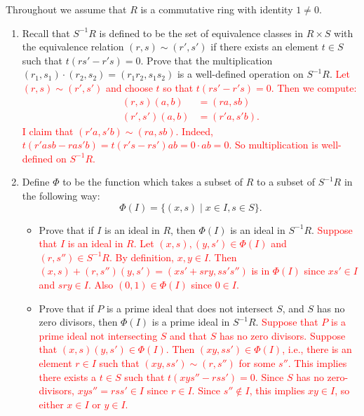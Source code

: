 \documentclass[12pt]{article}
\newcommand{\solution}[1]{\textcolor{red}{#1}}
\begin{document}
\pagestyle{fancy}

Throughout we assume that $R$ is a commutative ring with identity
$1\neq 0$.
\begin{enumerate}
\item Recall that $S^{-1}R$ is defined to be the set of equivalence
  classes in $R\times S$ with the equivalence relation $(r,s)\sim
  (r',s')$ if there exists an element $t\in S$ such that
  $t(rs'-r's)=0$. Prove that the multiplication $(r_1,s_1)\cdot
  (r_2,s_2)=(r_1r_2,s_1s_2)$ is a well-defined operation on
  $S^{-1}R$. 
\solution{
Let $(r,s)\sim (r',s')$ and choose $t$ so that $t(rs'-r's)=0$. Then we
compute:
\begin{align*}
  (r,s)(a,b) &= (ra,sb)\\
(r',s')(a,b) &= (r'a,s'b).
\end{align*}
I claim that $(r'a,s'b)\sim (ra,sb)$. Indeed, $t(r'asb-ras'b) =
t(r's-rs')ab = 0 \cdot ab = 0$. So multiplication is well-defined on
$S^{-1}R$. 
}
\item Define $\Phi$ to be the
  function which takes a subset of $R$ to a subset of $S^{-1}R$ in the
  following way: 
  \[\Phi(I) = \{(x,s) \mid x\in I, s\in S\}.\]
  \begin{itemize}
  \item Prove that if $I$ is an ideal in $R$, then $\Phi(I)$ is an
    ideal in $S^{-1}R$. 
\solution{Suppose that $I$ is an ideal in $R$. Let $(x,s), (y,s')\in \Phi(I)$ and
  $(r,s'') \in S^{-1}R$. By definition, $x,y\in I$. Then
  $(x,s)+(r,s'')(y,s') = (xs'+sry,ss's'')$ is in $\Phi(I)$ since
  $xs'\in I$ and $sry\in I$. Also $(0,1)\in \Phi(I)$ since $0\in I$. }
  \item Prove that if $P$ is a prime ideal that does not intersect
    $S$, and $S$ has no zero divisors, then $\Phi(I)$ is a prime ideal
    in $S^{-1}R$. 
\solution{Suppose that $P$ is a prime ideal not intersecting $S$ and
  that $S$ has no zero divisors. Suppose that $(x,s)(y,s')\in
  \Phi(I).$ Then $(xy,ss')\in \Phi(I)$, i.e., there is an element
  $r\in I$ such that $(xy,ss')\sim (r,s'')$ for some $s''$. This
  implies there exists a $t\in S$ such that $t(xys''-rss')=0$. Since
  $S$ has no zero-divisors, $xys''=rss'\in I$ since $r\in I$. Since
  $s''\notin I$, this implies $xy\in I$, so either $x\in I$ or $y\in
  I$.} 
  \end{itemize}



\end{enumerate}
\end{document}

